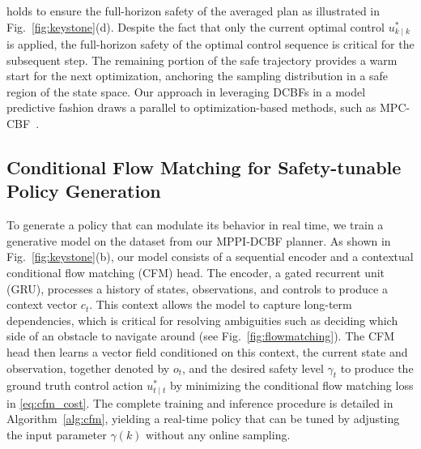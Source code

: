 \documentclass[letterpaper, 10 pt, conference]{ieeeconf}
\begin{document}
 holds to ensure the full-horizon safety of the averaged plan as illustrated in Fig.~\ref{fig:keystone}(d). Despite the fact that only the current optimal control $u^*_{k\mid k}$ is applied, the full-horizon safety of the optimal control sequence is critical for the subsequent step. The remaining portion of the safe trajectory provides a warm start for the next optimization, anchoring the sampling distribution in a safe region of the state space. Our approach in leveraging DCBFs in a model predictive fashion draws a parallel to optimization-based methods, such as MPC-CBF~\cite{zeng2021safety}.

\subsection{Conditional Flow Matching for Safety-tunable Policy Generation}
To generate a policy that can modulate its behavior in real time, we train a generative model on the dataset from our MPPI-DCBF planner. As shown in Fig.~\ref{fig:keystone}(b), our model consists of a sequential encoder and a contextual conditional flow matching (CFM) head. The encoder, a gated recurrent unit (GRU), processes a history of states, observations, and controls to produce a context vector $c_t$. This context allows the model to capture long-term dependencies, which is critical for resolving ambiguities such as deciding which side of an obstacle to navigate around (see Fig.~\ref{fig:flowmatching}). The CFM head then learns a vector field conditioned on this context, the current state and observation, together denoted by $o_t$, and the desired safety level $\gamma_t$ to produce the ground truth control action $u^*_{t\mid t}$ by minimizing the conditional flow matching loss in \eqref{eq:cfm_cost}. The complete training and inference procedure is detailed in Algorithm~\ref{alg:cfm}, yielding a real-time policy that can be tuned by adjusting the input parameter $\gamma(k)$ without any online sampling.
\end{document}
